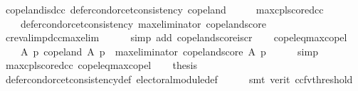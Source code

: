 \begin{isabellebody}
{\isafoldproof}%
%
\isadelimproof
\isanewline
%
\endisadelimproof
\isanewline
{}\isamarkupfalse%
\ copeland{\isacharunderscore}{\kern0pt}is{\isacharunderscore}{\kern0pt}dcc{\isacharcolon}{\kern0pt}\ {\isachardoublequoteopen}defer{\isacharunderscore}{\kern0pt}condorcet{\isacharunderscore}{\kern0pt}consistency\ copeland{\isachardoublequoteclose}\isanewline
%
\isadelimproof
%
\endisadelimproof
%
\isatagproof
{}\isamarkupfalse%
\ {\isacharminus}{\kern0pt}\isanewline
\ \ \isamarkupfalse%
\ max{\isacharunderscore}{\kern0pt}cplscore{\isacharunderscore}{\kern0pt}dcc{\isacharcolon}{\kern0pt}\isanewline
\ \ \ \ {\isachardoublequoteopen}defer{\isacharunderscore}{\kern0pt}condorcet{\isacharunderscore}{\kern0pt}consistency\ {\isacharparenleft}{\kern0pt}max{\isacharunderscore}{\kern0pt}eliminator\ copeland{\isacharunderscore}{\kern0pt}score{\isacharparenright}{\kern0pt}{\isachardoublequoteclose}\isanewline
\ \ \ \ \isamarkupfalse%
\ cr{\isacharunderscore}{\kern0pt}eval{\isacharunderscore}{\kern0pt}imp{\isacharunderscore}{\kern0pt}dcc{\isacharunderscore}{\kern0pt}max{\isacharunderscore}{\kern0pt}elim\isanewline
\ \ \ \ \isamarkupfalse%
\ {\isacharparenleft}{\kern0pt}simp\ add{\isacharcolon}{\kern0pt}\ copeland{\isacharunderscore}{\kern0pt}score{\isacharunderscore}{\kern0pt}is{\isacharunderscore}{\kern0pt}cr{\isacharparenright}{\kern0pt}\isanewline
\ \ \isamarkupfalse%
\ copel{\isacharunderscore}{\kern0pt}eq{\isacharunderscore}{\kern0pt}max{\isacharunderscore}{\kern0pt}copel{\isacharcolon}{\kern0pt}\isanewline
\ \ \ \ {\isachardoublequoteopen}{\isasymAnd}A\ p{\isachardot}{\kern0pt}\ {\isacharparenleft}{\kern0pt}copeland\ A\ p\ {\isasymequiv}\ max{\isacharunderscore}{\kern0pt}eliminator\ copeland{\isacharunderscore}{\kern0pt}score\ A\ p{\isacharparenright}{\kern0pt}{\isachardoublequoteclose}\isanewline
\ \ \ \ \isamarkupfalse%
\ simp\isanewline
\ \ \isamarkupfalse%
\ max{\isacharunderscore}{\kern0pt}cplscore{\isacharunderscore}{\kern0pt}dcc\ copel{\isacharunderscore}{\kern0pt}eq{\isacharunderscore}{\kern0pt}max{\isacharunderscore}{\kern0pt}copel\isanewline
\ \ \isamarkupfalse%
\ {\isacharquery}{\kern0pt}thesis\isanewline
\ \ \ \ \isamarkupfalse%
\ defer{\isacharunderscore}{\kern0pt}condorcet{\isacharunderscore}{\kern0pt}consistency{\isacharunderscore}{\kern0pt}def\ electoral{\isacharunderscore}{\kern0pt}module{\isacharunderscore}{\kern0pt}def\isanewline
\ \ \ \ \isamarkupfalse%
\ {\isacharparenleft}{\kern0pt}smt\ {\isacharparenleft}{\kern0pt}verit{\isacharcomma}{\kern0pt}\ ccfv{\isacharunderscore}{\kern0pt}threshold{\isacharparenright}{\kern0pt}{\isacharparenright}{\kern0pt}\isanewline
{}\isamarkupfalse%
%
\endisatagproof
{\isafoldproof}%
%
\isadelimproof
\isanewline
%
\endisadelimproof
%
\isadelimtheory
\isanewline
%
\endisadelimtheory
%
\isatagtheory
{}\isamarkupfalse%
%
\endisatagtheory
{\isafoldtheory}%
%
\isadelimtheory
%
\endisadelimtheory
%
\end{isabellebody}%

